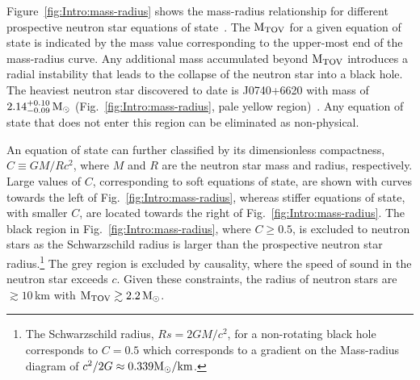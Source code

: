 \documentclass[../Thesis.tex]{subfiles}
\begin{document}
    Figure~\ref{fig:Intro:mass-radius} shows the mass-radius relationship for different prospective neutron star equations of state~\cite{Hu2020}. 
    The $\mathrm{M_{TOV}}$ for a given equation of state is indicated by the mass value corresponding to the upper-most end of the mass-radius curve.
    Any additional mass accumulated beyond $\mathrm{M_{TOV}}$ introduces a radial instability that leads to the collapse of the neutron star into a black hole.
    The heaviest neutron star  discovered to date is J0740+6620 with mass of $2.14^{+0.10}_{-0.09}\,\mathrm{M}_{\odot}$ (Fig.~\ref{fig:Intro:mass-radius}, pale yellow region)~\cite{Cromartie2020}.
    Any equation of state that does not enter this region can be eliminated as non-physical. \par
    
    An equation of state can further classified by its dimensionless compactness, $C\equiv GM/Rc^2$, where $M$ and $R$ are the neutron star mass and radius, respectively.
    Large values of $C$, corresponding to soft equations of state, are shown with curves towards the left of Fig.~\ref{fig:Intro:mass-radius}, whereas stiffer equations of state, with smaller $C$, are located towards the right of Fig.~\ref{fig:Intro:mass-radius}.
    The black region in Fig.~\ref{fig:Intro:mass-radius}, where $C\geqslant 0.5$, is excluded to neutron stars as the Schwarzschild radius is larger than the prospective neutron star radius.\footnote{The Schwarzschild radius, $Rs = 2GM/c^2$, for a non-rotating black hole corresponds to $C=0.5$ which corresponds to a gradient on the Mass-radius diagram of $c^2/2G \approx 0.339 \mathrm{M}_{\odot}/\mathrm{km}$.}
    The grey region is excluded by causality, where the speed of sound in the neutron star exceeds $c$.
    Given these constraints, the radius of neutron stars are $\gtrsim 10\,$km with $\mathrm{M_{TOV}} \gtrsim 2.2\, \mathrm{M}_{\odot}$. 
    
\end{document}
